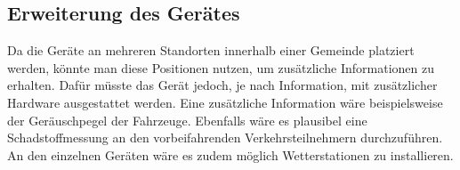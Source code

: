 \subsection{Erweiterung des Gerätes}
Da die Geräte an mehreren Standorten innerhalb einer Gemeinde platziert werden, könnte man diese Positionen nutzen, um zusätzliche Informationen zu erhalten. Dafür müsste das Gerät jedoch, je nach Information, mit zusätzlicher Hardware ausgestattet werden. Eine zusätzliche Information wäre beispielsweise der Geräuschpegel der Fahrzeuge. Ebenfalls wäre es plausibel eine Schadstoffmessung an den vorbeifahrenden Verkehrsteilnehmern durchzuführen. An den einzelnen Geräten wäre es zudem möglich Wetterstationen zu installieren.